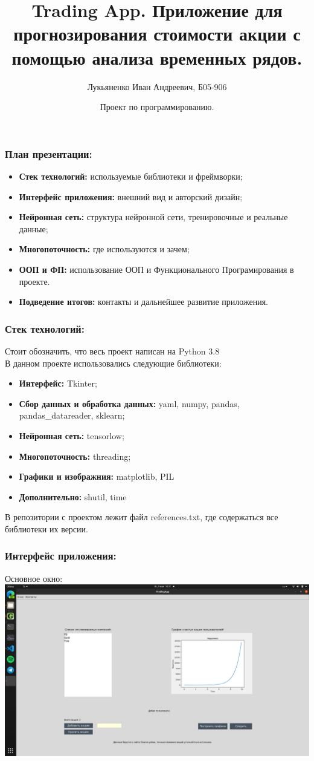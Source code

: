 \documentclass{beamer}
\title[] %
{Trading App. Приложение для прогнозирования стоимости акции с помощью анализа временных рядов.}
\subtitle{}
\author[Лукьяненеко И. А.] %
{Лукьяненко Иван Андреевич, Б05-906}
\institute[MIPT] %
{
  Студент МФТИ ФПМИ 2 курс
}
\date[Python|ML 2021] %
{Проект по программированию.}
\begin{document}
\frame{\titlepage}
\begin{frame}


\frametitle{План презентации:}

 \begin{itemize}
  \item \textbf{Стек технологий:} используемые библиотеки и фреймворки;
  \item \textbf{Интерфейс приложения:} внешний вид и авторский дизайн;
  \item \textbf{Нейронная сеть:} структура нейронной сети, тренировочные и реальные данные;
  \item \textbf{Многопоточность:} где используются и зачем;
  \item \textbf{ООП и ФП:} использование ООП и Функционального Програмирования в проекте.
  \item \textbf{Подведение итогов:} контакты и дальнейшее развитие приложения.
 \end{itemize}

\end{frame}

\begin{frame}

 \frametitle{Стек технологий:}
 Стоит обозначить, что весь проект написан на Python 3.8\\
 В данном проекте использовались следующие библиотеки:
 \begin{itemize}
  \item \textbf{Интерфейс:} Tkinter;
  \item \textbf{Сбор данных и обработка данных:} yaml, numpy, pandas, pandas\_datareader, sklearn;
  \item \textbf{Нейронная сеть:} tensorlow;
  \item \textbf{Многопоточность:} threading;
  \item \textbf{Графики и изображния:} matplotlib, PIL
  \item \textbf{Дополнительно:} shutil, time
 \end{itemize}
 В репозитории с проектом лежит файл references.txt, где содержаться все библиотеки их версии.
\end{frame}

\begin{frame}
 \frametitle{Интерфейс приложения:}
 Основное окно:\\
 \includegraphics[scale=0.176]{mainWindow.png}
\end{frame}
\end{document}
